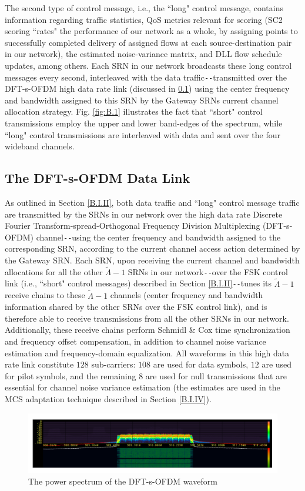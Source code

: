 The second type of control message, i.e., the ``long" control message, contains information regarding traffic statistics, QoS metrics relevant for scoring (SC2 scoring ``rates" the performance of our network as a whole, by assigning points to successfully completed delivery of assigned flows at each source-destination pair in our network), the estimated noise-variance matrix, and DLL flow schedule updates, among others. Each SRN in our network broadcasts these long control messages every second, interleaved with the data traffic\texttt{-{}-}transmitted over the DFT-s-OFDM high data rate link (discussed in \ref{B.I.III}) using the center frequency and bandwidth assigned to this SRN by the Gateway SRNs current channel allocation strategy. Fig. \ref{fig:B.1} illustrates the fact that ``short" control transmissions employ the upper and lower band-edges of the spectrum, while ``long" control transmissions are interleaved with data and sent over the four wideband channels.
\subsection{The DFT-s-OFDM Data Link}\label{B.I.III}
As outlined in Section \ref{B.I.II}, both data traffic and ``long" control message traffic are transmitted by the SRNs in our network over the high data rate Discrete Fourier Transform-spread-Orthogonal Frequency Division Multiplexing (DFT-s-OFDM) channel\texttt{-{}-}using the center frequency and bandwidth assigned to the corresponding SRN, according to the current channel access action determined by the Gateway SRN. Each SRN, upon receiving the current channel and bandwidth allocations for all the other $\tilde{\Lambda}{-}1$ SRNs in our network\texttt{-{}-}over the FSK control link (i.e., ``short" control messages) described in Section \ref{B.I.II}\texttt{-{}-}tunes its $\tilde{\Lambda}{-}1$ receive chains to these $\tilde{\Lambda}{-}1$ channels (center frequency and bandwidth information shared by the other SRNs over the FSK control link), and is therefore able to receive transmissions from all the other SRNs in our network. Additionally, these receive chains perform Schmidl \& Cox time synchronization and frequency offset compensation, in addition to channel noise variance estimation and frequency-domain equalization. All waveforms in this high data rate link constitute $128$ sub-carriers: $108$ are used for data symbols, $12$ are used for pilot symbols, and the remaining $8$ are used for null transmissions that are essential for channel noise variance estimation (the estimates are used in the MCS adaptation technique described in Section \ref{B.I.IV}).
\begin{figure} [htb]
    \centerline{
    \includegraphics[width = 1.0\textwidth]{Data_Channel_DFT-spread-OFDM_Power_Spectrum.PNG}}
    \caption{The power spectrum of the DFT-s-OFDM waveform}
    \label{fig:B.2}
\end{figure}

